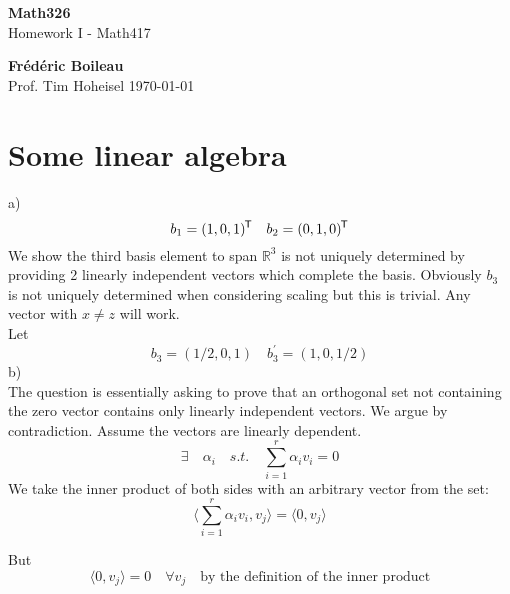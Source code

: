\documentclass{article}
\newcommand*{\tran}{^{\mkern-1.5mu\mathsf{T}}}%
\begin{document}
	\begin{titlepage}
		\begin{center}
			\vspace*{1cm}
			\textbf{Math326}\\
			\vspace{0.5cm}
			Homework I - Math417
			
			\vspace{1.5cm}
			
			\textbf{Frédéric Boileau}\\
			\vspace{2cm}
			Prof. 
			Tim Hoheisel
			\vfill
			\today
			\thispagestyle{empty}
		\end{center}
	\end{titlepage}
	\newpage
	\tableofcontents
	\thispagestyle{empty}
	\clearpage
	
	\section{Some linear algebra}
	
	a)\begin{equation*}
		b_1 = (1,0,1)\tran \quad b_2=(0,1,0)\tran
	\end{equation*}
	We show the third basis element to span  $\mathbb{R}^3$ is not uniquely determined by providing 2 linearly independent vectors which complete the basis. Obviously $b_3$ is not uniquely determined when considering scaling but this is trivial. Any vector with $x\neq z$ will work. \\
	Let \begin{equation*}
		b_3 = (1/2,0,1) \quad b^\prime_{3} = (1,0,1/2)
	\end{equation*}
	b) \\The question is essentially asking to prove that an orthogonal set not containing the zero vector contains only linearly independent vectors. 
	We argue by contradiction. Assume the vectors are linearly dependent. 
	\begin{equation*}
		\exists \quad \alpha_i \quad s.t. \quad \sum_{i=1}^{r}\alpha_i v_i = 0
	\end{equation*}
	We take the inner product of both sides with an arbitrary vector from the set:\begin{equation*}
		\langle \sum_{i=1}^{r}\alpha_i v_i, v_j \rangle = \langle 0,v_j \rangle
	\end{equation*}
	
	But\begin{equation*}
		\langle 0,v_j\rangle = 0 \quad \forall v_j \quad \text{by the definition of the inner product}
	\end{equation*}
	
\end{document}
